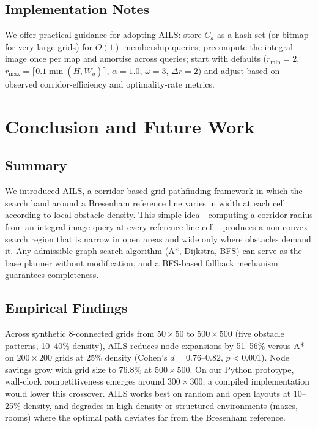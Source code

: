 \documentclass[journal]{IEEEtran}
\begin{document}
\subsection{Implementation Notes}

We offer practical guidance for adopting AILS:
store $C_a$ as a hash set (or bitmap for very large grids) for $O(1)$ membership queries;
precompute the integral image once per map and amortise across queries;
start with defaults ($r_{\min}{=}2$, $r_{\max}{=}\lceil 0.1 \min(H,W_g)\rceil$, $\alpha{=}1.0$, $\omega{=}3$, $\Delta r{=}2$) and adjust based on observed corridor-efficiency and optimality-rate metrics.

\section{Conclusion and Future Work}
\label{sec:conclusion}

\subsection{Summary}

We introduced AILS, a corridor-based grid pathfinding framework in which the search band around a Bresenham reference line varies in width at each cell according to local obstacle density.
This simple idea---computing a corridor radius from an integral-image query at every reference-line cell---produces a non-convex search region that is narrow in open areas and wide only where obstacles demand it.
Any admissible graph-search algorithm (A*, Dijkstra, BFS) can serve as the base planner without modification, and a BFS-based fallback mechanism guarantees completeness.

\subsection{Empirical Findings}

Across synthetic 8-connected grids from $50{\times}50$ to $500{\times}500$ (five obstacle patterns, 10--40\% density), AILS reduces node expansions by 51--56\% versus A* on $200{\times}200$ grids at 25\% density (Cohen's $d = 0.76$--$0.82$, $p < 0.001$).
Node savings grow with grid size to 76.8\% at $500{\times}500$.
On our Python prototype, wall-clock competitiveness emerges around $300{\times}300$; a compiled implementation would lower this crossover.
AILS works best on random and open layouts at 10--25\% density, and degrades in high-density or structured environments (mazes, rooms) where the optimal path deviates far from the Bresenham reference.
\end{document}
